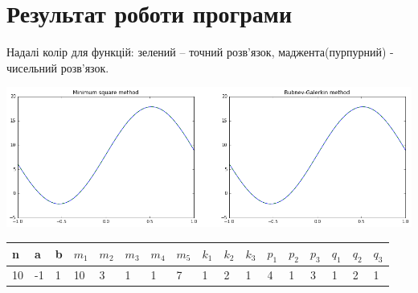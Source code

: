 \section{Результат роботи програми}

Надалі колір для функцій: зелений -- точний розв'язок, маджента(пурпурний) - чисельний розв'язок.

\bigskip

\includegraphics[width=1\linewidth]{res.png}

\begin{center}
    \begin{tabular}{| l | l | l | l | l | l | l | l | l | l | l | l | l | l | l | l | l |}
	\hline
	n & a & b & $m_1$ & $m_2$ & $m_3$ & $m_4$ & $m_5$ & $k_1$ & $k_2$ & $k_3$ & $p_1$ & $p_2$ & $p_3$ & $q_1$ & $q_2$ & $q_3$ \\ \hline
	10 & -1 & 1 & 10 & 3 & 1 & 1 & 7 & 1 & 2 & 1 & 4 & 1 & 3 & 1 & 2 & 1 \\ \hline


    \end{tabular}
\end{center}

